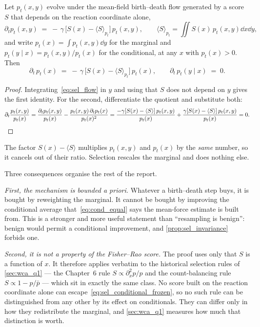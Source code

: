 \begin{proposition}
\label{prop:sel_invariance}
Let $p_t(x,y)$ evolve under the mean-field birth--death flow generated by a score $S$ that
depends on the reaction coordinate alone,
\begin{equation}
  \partial_t p_t(x,y) \;=\; -\,\gamma\,\bigl[S(x)-\langle S\rangle_{p_t}\bigr]\,p_t(x,y),
  \qquad
  \langle S\rangle_{p_t}=\iint S(x)\,p_t(x,y)\dd x\dd y ,
  \label{eq:sel_flow}
\end{equation}
and write $p_t(x)=\int p_t(x,y)\dd y$ for the marginal and $p_t(y\mid x)=p_t(x,y)/p_t(x)$ for
the conditional, at any $x$ with $p_t(x)>0$. Then
\begin{equation}
  \partial_t\, p_t(x) \;=\; -\,\gamma\,\bigl[S(x)-\langle S\rangle_{p_t}\bigr]\,p_t(x),
  \qquad
  \partial_t\, p_t(y\mid x) \;=\; 0 .
  \label{eq:sel_conditional_frozen}
\end{equation}
\end{proposition}

\begin{proof}
Integrating~\eqref{eq:sel_flow} in $y$ and using that $S$ does not depend on $y$ gives the
first identity. For the second, differentiate the quotient and substitute both:
\[
  \partial_t \frac{p_t(x,y)}{p_t(x)}
  = \frac{\partial_t p_t(x,y)}{p_t(x)} - \frac{p_t(x,y)\,\partial_t p_t(x)}{p_t(x)^2}
  = \frac{-\gamma[S(x)-\langle S\rangle]\,p_t(x,y)}{p_t(x)}
    + \frac{\gamma[S(x)-\langle S\rangle]\,p_t(x,y)}{p_t(x)}
  = 0 . \qedhere
\]
\end{proof}

The factor $S(x)-\langle S\rangle$ multiplies $p_t(x,y)$ and $p_t(x)$ by the \emph{same}
number, so it cancels out of their ratio. Selection rescales the marginal and does nothing
else.

Three consequences organise the rest of the report.

\emph{First, the mechanism is bounded a priori.} Whatever a birth--death step buys, it is
bought by reweighting the marginal. It cannot be bought by improving the conditional average
that~\eqref{eq:cond_equal} says the mean-force estimate is built from. This is a stronger and
more useful statement than ``resampling is benign'': benign would permit a conditional
improvement, and \cref{prop:sel_invariance} forbids one.

\emph{Second, it is not a property of the Fisher--Rao score.} The proof uses only that $S$ is
a function of $x$. It therefore applies verbatim to the historical selection rules of
\cref{sec:wca_q1} --- the Chapter~6 rule $S\propto\partial_x^2 p/p$ and the count-balancing
rule $S\propto 1-p/\bar p$ --- which sit in exactly the same class. No score built on the
reaction coordinate alone can escape~\eqref{eq:sel_conditional_frozen}, so no such rule can
be distinguished from any other by its effect on conditionals. They can differ only in how
they redistribute the marginal, and \cref{sec:wca_q1} measures how much that distinction is
worth.

